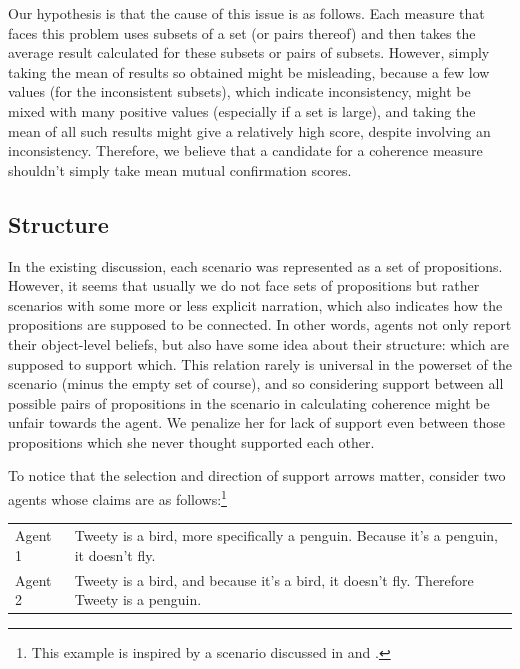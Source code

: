 \documentclass[10pt,]{scrartcl}
\begin{document}
Our hypothesis is that the cause of this issue is as follows. Each measure that faces this problem  uses subsets of a set (or pairs thereof) and then takes the average
result calculated for these subsets or pairs of subsets. However, simply
taking the mean of results so obtained might be misleading, because a
few low values (for the inconsistent subsets), which indicate
inconsistency, might be mixed with many positive values (especially if a
set is large), and taking the mean of all such results might give a
relatively high score, despite involving an inconsistency. Therefore, we
believe that a candidate for a coherence measure shouldn't simply take
mean mutual confirmation scores.

\subsection{Structure}

In the existing discussion, each scenario was represented as a set of
propositions. However, it seems that usually we do not face sets of
propositions but rather scenarios with some more or less explicit
narration, which also indicates how the propositions are supposed to be
connected. In other words, agents not only report their object-level
beliefs, but also have some idea about their structure: which are
supposed to support which. This relation rarely is universal in the
powerset of the scenario (minus the empty set of course), and so
considering support between all possible pairs of propositions in the
scenario in calculating coherence might be unfair towards the agent. We
penalize her for lack of support even between those propositions which
she never thought supported each other.

To notice that the selection and direction of support arrows matter, 
consider two agents whose claims are as follows:\footnote{This example is inspired by a scenario discussed in \citep[50]{bovens2004bayesian} and \citep{Meijs2007Alleged}.}

\vspace{2mm}

\begin{center}
\begin{tabular}{lp{9cm}}
\textsf{Agent 1}     & Tweety is a bird, more specifically a penguin. Because it’s a penguin, it doesn’t fly.  \\
\textsf{Agent 2}     &  Tweety is a bird, and because it’s a bird, it doesn't fly. Therefore Tweety is a penguin. \\
\end{tabular}
\end{center}
\end{document}
